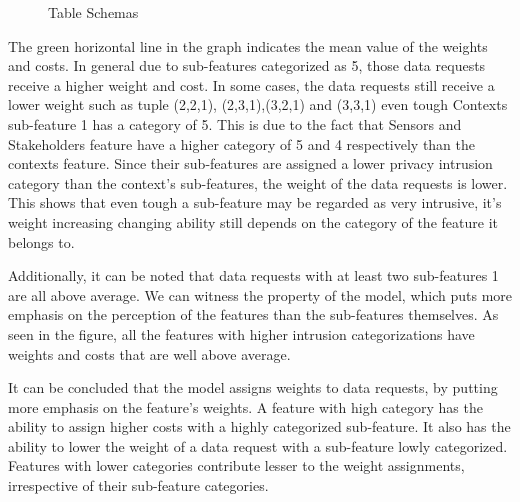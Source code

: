 \begin{figure}[htp]
\hspace{1em}
\caption{Table Schemas}
\label{fig:st3}
\end{figure}

The green horizontal line in the graph indicates the mean value of the weights and costs. In general due to sub-features categorized as 5, those data requests receive a higher weight and cost. In some cases, the data requests still receive a lower weight such as tuple (2,2,1),
(2,3,1),(3,2,1) and (3,3,1) even tough Contexts sub-feature 1 has a category of 5. This is due to the fact that Sensors  and Stakeholders feature have a higher category of 5 and 4 respectively than the contexts feature. Since their sub-features are assigned a lower privacy intrusion category than the context's sub-features, the weight of the data requests is lower. This shows that even tough a sub-feature may be regarded as very intrusive, it's weight increasing changing ability still depends on the category of the feature it belongs to.

Additionally, it can be noted that data requests with at least two sub-features 1 are all above average. We can witness the property of the model, which puts more emphasis on the perception of the features than the sub-features themselves. As seen in the figure, all the features with higher intrusion categorizations have weights and costs that are well above average.

It can  be concluded that the model assigns weights to data requests, by putting more emphasis on the feature's weights. A feature with high category
has the ability to assign higher costs with a highly categorized sub-feature. It also has the ability to lower the weight of a data request with a sub-feature lowly
categorized. Features with lower categories contribute lesser to the weight assignments, irrespective of their sub-feature categories.







